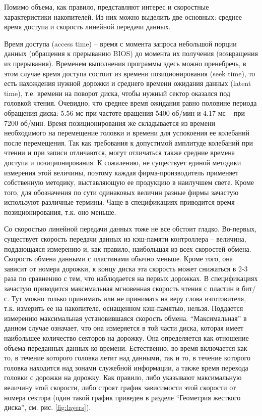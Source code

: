 \documentclass[bachelor, och, referat]{SCWorks}
\begin{document}
Помимо объема, как правило, представляют интерес и скоростные характеристики накопителей. Из них можно выделить две основных: среднее время доступа и скорость линейной передачи данных.

Время доступа (access time) -- время с момента запроса небольшой порции данных (обращения к прерыванию BIOS) до момента их получения (возвращения из прерывания). Временем выполнения программы здесь можно пренебречь, в этом случае время доступа состоит из времени позиционирования (seek time), то есть нахождения нужной дорожки и среднего времени ожидания данных (latent time), т.е. времени на поворот диска, чтобы нужный сектор оказался под головкой чтения. Очевидно, что среднее время ожидания равно половине периода обращения диска: 5.56 мс при частоте вращения 5400 об/мин и 4.17 мс -- при 7200 об/мин. Время позиционирования же складывается из времени необходимого на перемещение головки и времени для успокоения ее колебаний после перемещения. Так как требования к допустимой амплитуде колебаний при чтении и при записи отличаются, могут отличаться также средние времена доступа и позиционирования. К сожалению, не существует единой методики измерения этой величины, поэтому каждая фирма-производитель применяет собственную методику, выставляющую ее продукцию в наилучшем свете. Кроме того, для обозначения по сути одинаковых величин разные фирмы зачастую используют различные термины. Чаще в спецификациях приводится время позиционирования, т.к. оно меньше.

Со скоростью линейной передачи данных тоже не все обстоит гладко. Во-первых, существует скорость передачи данных из кэш-памяти контроллера -- величина, поддающаяся измерению и, как правило, наибольшая из всех скоростей обмена. Скорость обмена данными с пластинами обычно меньше. Кроме того, она зависит от номера дорожки, к концу диска эта скорость может снижаться в 2-3 раза по сравнению с тем, что наблюдается на первых дорожках. В спецификациях зачастую приводится максимальная мгновенная скорость чтения с пластин в бит/с. Тут можно только принимать или не принимать на веру слова изготовителя, т.к. измерить ее на накопителе, оснащенном кэш-памятью, нельзя. Поддается измерению максимальная установившаяся скорость обмена. ``Максимальная'' в данном случае означает, что она измеряется в той части диска, которая имеет наибольшее количество секторов на дорожку. Она определяется как отношение объема переданных данных ко времени. Естественно, во время включается как то, в течение которого головка летит над данными, так и то, в течение которого головка находится над зонами служебной информации, а также время перехода головки с дорожки на дорожку. Как правило, либо указывают максимальную величину этой скорости, либо строят график зависимости этой скорости от номера сектора (один такой график приведен в разделе ``Геометрия жесткого диска'', см. рис. \ref{fig:layers}).
\end{document}
